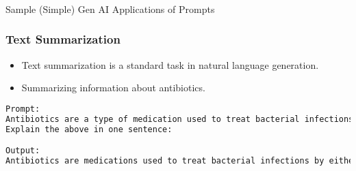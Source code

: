 \begin{frame}[fragile]\frametitle{}
\begin{center}
{\Large Sample (Simple) Gen AI Applications of Prompts}
\end{center}
\end{frame}

\begin{frame}[fragile]\frametitle{Text Summarization}
\begin{itemize}
    \item Text summarization is a standard task in natural language generation.
    \item Summarizing information about antibiotics.
\end{itemize}
\begin{lstlisting}[language=HTML]
Prompt:
Antibiotics are a type of medication used to treat bacterial infections. They work by either killing the bacteria or preventing them from reproducing, allowing the bodys immune system to fight off the infection. Antibiotics are usually taken orally in the form of pills, capsules, or liquid solutions, or sometimes administered intravenously. They are not effective against viral infections, and using them inappropriately can lead to antibiotic resistance.
Explain the above in one sentence:

Output:
Antibiotics are medications used to treat bacterial infections by either killing the bacteria or stopping them from reproducing, but they are not effective against viruses and overuse can lead to antibiotic resistance.
\end{lstlisting}
\end{frame}

